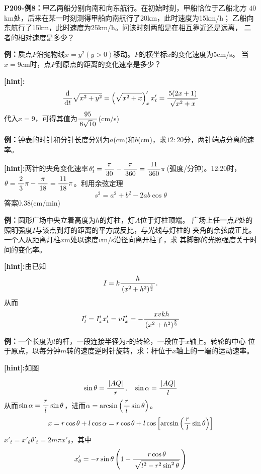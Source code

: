 {\bf P209-例8：}甲乙两船分别向南和向东航行。在初始时刻，甲船恰位于乙船北方
$40$km处，后来在某一时刻测得甲船向南航行了20km，此时速度为15km/h；
乙船向东航行了15km，此时速度为25km/h。问该时刻两船是在相互靠近还是远离，
二者的相对速度是多少？

{\bf 例：}质点$P$沿抛物线$x=y^2(y>0)$移动。$P$的横坐标$x$的变化速度为$5$cm/s。
当$x=9$cm时，点$P$到原点的距离的变化速率是多少？

{\bf [hint]:}
$$\displaystyle\frac{\,{\mathrm{d}}\,}{\,{\mathrm{d} t}\,}\sqrt{x^2+y^2}=\left(\sqrt{x^2+x}\right)'_xx'_t
=\displaystyle\frac{\,{5(2x+1)}\,}{\,{\sqrt{x^2+x}}\,}$$
代入$x=9$，可得其值为$\displaystyle\frac{\,{95}\,}{\,{6\sqrt10}\,}$(cm/s)

{\bf 例：}钟表的时针和分针长度分别为$a$(cm)和$b$(cm)，求$12:20$分，两针端点分离的速率。

{\bf [hint]:}两针的夹角变化速率$\theta'_t=\displaystyle\frac{\,{\pi}\,}{\,{30}\,}-\displaystyle\frac{\,{\pi}\,}{\,{360}\,}
=\displaystyle\frac{\,{11}\,}{\,{360}\,}\pi$(弧度/分钟)。12:20时，$\theta=\displaystyle\frac{\,{2}\,}{\,{3}\,}\pi-\displaystyle\frac{\,{\pi}\,}{\,{18}\,}
=\displaystyle\frac{\,{11}\,}{\,{18}\,}\pi$。利用余弦定理
$$s^2=a^2+b^2-2ab\cos\theta$$
答案$0.38$(cm/min)

{\bf 例：}圆形广场中央立着高度为$h$的灯柱，灯$A$位于灯柱顶端。
广场上任一点$P$处的照明强度$I$与该点到灯的距离的平方成反比，与光线与灯柱的
夹角的余弦成正比。一个人从距离灯柱$x$m处以速度$v$m/s沿径向离开柱子，求
其脚部的光照强度关于时间的变化率。

{\bf [hint]:}由已知
$$I=k\displaystyle\frac{\,{h}\,}{\,{(x^2+h^2)^{\frac32}}\,}.$$
从而
$$I'_t=I'_xx'_t=vI'_x=-\displaystyle\frac{\,{xvkh}\,}{\,{(x^2+h^2)^{\frac52}}\,}$$

{\bf 例：}一个长度为$l$的杆，一段连接半径为$r$的转轮，一段位于$x$轴上。转轮的中心
位于原点，以每分钟$m$转的速度逆时针旋转，求：杆位于$x$轴上的一端的运动速率。

{\bf [hint]:}如图
\begin{center}
\end{center}
$$\sin\theta=\displaystyle\frac{\,{|AQ|}\,}{\,{r}\,},\quad \sin\alpha=\displaystyle\frac{\,{|AQ|}\,}{\,{l}\,}$$
从而$\sin\alpha=\displaystyle\frac{\,{r}\,}{\,{l}\,}\sin\theta$，进而$\alpha=\arcsin\left(
\displaystyle\frac{\,{r}\,}{\,{l}\,}\sin\theta\right)$。
$$x=r\cos\theta+l\cos\alpha=r\cos\theta+l\cos
\left[\arcsin\left(\displaystyle\frac{\,{r}\,}{\,{l}\,}\sin\theta\right)\right]$$
$x'_t=x'_{\theta}\theta'_t=2m\pi x'_{\theta}$，其中
$$x'_{\theta}
=-r\sin\theta\left(1-\displaystyle\frac{\,{r\cos\theta}\,}{\,{\sqrt{l^2-r^2\sin^2\theta}}\,}\right)$$


